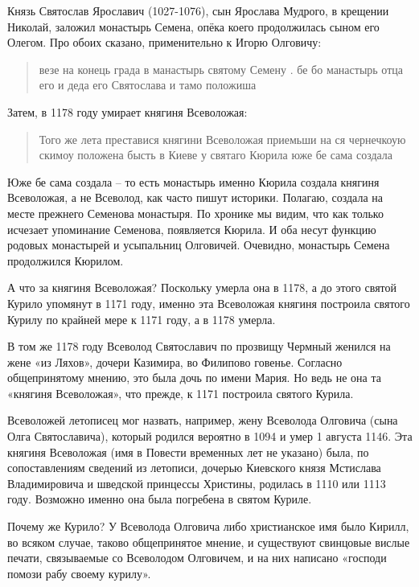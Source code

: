 Князь Святослав Ярославич (1027-1076), сын Ярослава Мудрого, в крещении Николай, заложил монастырь Семена, опёка коего продолжилась сыном его Олегом. Про обоих сказано, применительно к Игорю Олговичу:

\begin{quotation}
везе на конець града в манастырь святому 
Семену . бе бо манастырь отца его и деда его Святослава и тамо положиша
\end{quotation}

Затем, в 1178 году умирает княгиня Всеволожая: 

\begin{quotation}
Того же лета преставися княгини Всеволожая приемьши на ся чернечкоую скимоу положена бысть в Киеве у святаго Кюрила юже бе сама создала
\end{quotation}

Юже бе сама создала – то есть монастырь именно Кюрила создала княгиня Всеволожая, а не Всеволод, как часто пишут историки. Полагаю, создала на месте прежнего Семенова монастыря. По хронике мы видим, что как только исчезает упоминание Семенова, появляется Кюрила. И оба несут функцию родовых монастырей и усыпальниц Олговичей. Очевидно, монастырь Семена продолжился Кюрилом.

А что за княгиня Всеволожая? Поскольку умерла она в 1178, а до этого святой Курило упомянут в 1171 году, именно эта Всеволожая княгиня построила святого Курилу по крайней мере к 1171 году, а в 1178 умерла.

В том же 1178 году Всеволод Святославич по прозвищу Чермный женился на жене «из Ляхов», дочери Казимира, во Филипово говенье. Согласно общепринятому мнению, это была дочь по имени Мария. Но ведь не она та «княгиня Всеволожая», что прежде, к 1171 построила святого Курила.

Всеволожей летописец мог назвать, например, жену Всеволода Олговича (сына Олга Святославича), который родился вероятно в 1094 и умер 1 августа 1146. Эта княгиня Всеволожая (имя в Повести временных лет не указано) была, по сопоставлениям сведений из летописи, дочерью Киевского князя Мстислава Владимировича и шведской принцессы Христины, родилась в 1110 или 1113 году. Возможно именно она была погребена в святом Куриле.

Почему же Курило? У Всеволода Олговича либо христианское имя было Кирилл, во всяком случае, таково общепринятое мнение, и существуют свинцовые вислые печати, связываемые со Всеволодом Олговичем, и на них написано «господи помози рабу своему курилу».

